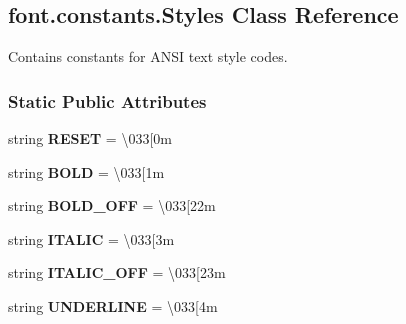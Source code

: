 \hypertarget{classfont_1_1constants_1_1Styles}{}\subsection{font.\+constants.\+Styles Class Reference}
\label{classfont_1_1constants_1_1Styles}


Contains constants for A\+N\+SI text style codes.  


\subsubsection*{Static Public Attributes}
\begin{DoxyCompactItemize}
\item 
string {\bfseries R\+E\+S\+ET} = \textquotesingle{}\textbackslash{}033\mbox{[}0m\textquotesingle{}\hypertarget{classfont_1_1constants_1_1Styles_ad29d2bc2798787e0440842fb4a481fb6}{}\label{classfont_1_1constants_1_1Styles_ad29d2bc2798787e0440842fb4a481fb6}

\item 
string {\bfseries B\+O\+LD} = \textquotesingle{}\textbackslash{}033\mbox{[}1m\textquotesingle{}\hypertarget{classfont_1_1constants_1_1Styles_a0f0afd96809e2254562ac6cc0fe119ab}{}\label{classfont_1_1constants_1_1Styles_a0f0afd96809e2254562ac6cc0fe119ab}

\item 
string {\bfseries B\+O\+L\+D\+\_\+\+O\+FF} = \textquotesingle{}\textbackslash{}033\mbox{[}22m\textquotesingle{}\hypertarget{classfont_1_1constants_1_1Styles_a574cd81c9ce162e8d28e10c8da5f7c88}{}\label{classfont_1_1constants_1_1Styles_a574cd81c9ce162e8d28e10c8da5f7c88}

\item 
string {\bfseries I\+T\+A\+L\+IC} = \textquotesingle{}\textbackslash{}033\mbox{[}3m\textquotesingle{}\hypertarget{classfont_1_1constants_1_1Styles_a055d7fd4d1d90090fe3b628353e1dd26}{}\label{classfont_1_1constants_1_1Styles_a055d7fd4d1d90090fe3b628353e1dd26}

\item 
string {\bfseries I\+T\+A\+L\+I\+C\+\_\+\+O\+FF} = \textquotesingle{}\textbackslash{}033\mbox{[}23m\textquotesingle{}\hypertarget{classfont_1_1constants_1_1Styles_a38293343c5f14e2a1a055b64532f2e3d}{}\label{classfont_1_1constants_1_1Styles_a38293343c5f14e2a1a055b64532f2e3d}

\item 
string {\bfseries U\+N\+D\+E\+R\+L\+I\+NE} = \textquotesingle{}\textbackslash{}033\mbox{[}4m\textquotesingle{}\hypertarget{classfont_1_1constants_1_1Styles_a3c88ee0f4b74663abb8336057ce907b8}{}\label{classfont_1_1constants_1_1Styles_a3c88ee0f4b74663abb8336057ce907b8}


\end{DoxyCompactItemize}
